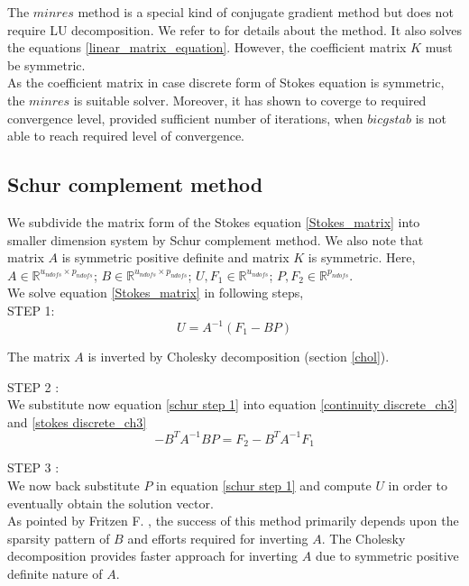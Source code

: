 \documentclass[a4paper,openany]{book}
\begin{document}
The $minres$ method is a special kind of conjugate gradient method but does not require LU decomposition. We refer to \cite{minres} for details about the method. It also solves the equations \ref{linear_matrix_equation}. However, the coefficient matrix $K$ must be symmetric. \\

As the coefficient matrix in case discrete form of Stokes equation is symmetric, the $minres$ is suitable solver. Moreover, it has shown to coverge to required convergence level, provided sufficient number of iterations, when $bicgstab$ is not able to reach required level of convergence.

\subsection{Schur complement method} \label{schur}

We subdivide the matrix form of the Stokes equation \eqref{Stokes_matrix} into smaller dimension system by Schur complement method. We also note that matrix $A$ is symmetric positive definite and matrix $K$ is symmetric.
Here, $A \in \mathbb{R}^{u_{ndofs} \times p_{ndofs}}$; $B \in \mathbb{R}^{u_{ndofs} \times p_{ndofs}}$; $U,F_1 \in \mathbb{R}^{u_{ndofs}}$; $P, F_2 \in \mathbb{R}^{p_{ndofs}}$. \\

We solve equation \eqref{Stokes_matrix} in following steps,\\

STEP 1: \\ 
\begin{equation}\label{schur step 1}
U = A^{-1}(F_1 - BP) 
\end{equation}

The matrix $A$ is inverted by Cholesky decomposition (section \ref{chol}). 

STEP 2 : \\
We substitute now equation \eqref{schur step 1} into equation \eqref{continuity discrete_ch3} and \eqref{stokes discrete_ch3}
\begin{equation}\label{schur step 2}
- B^T A^{-1} B P = F_2 - B^T A^{-1} F_1
\end{equation}

STEP 3 : \\
We now back substitute $P$ in equation \eqref{schur step 1} and compute $U$ in order to eventually obtain the solution vector.
\\

As pointed by Fritzen F. \cite{Fritzen}, the success of this method primarily depends upon the sparsity pattern of $B$ and efforts required for inverting $A$. The Cholesky decomposition provides faster approach for inverting $A$ due to symmetric positive definite nature of $A$. \\
\end{document}
